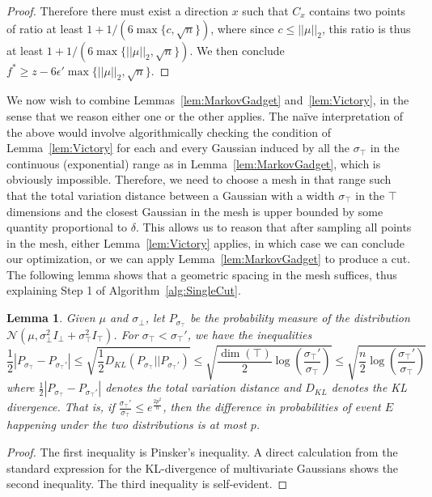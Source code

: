 \documentclass[11pt,letter]{article}
\newcommand{\Normal}{\mathcal{N}}
\newcommand{\perr}{\delta}
\newcounter{nTheorems}
\numberwithin{nTheorems}{section}
\newtheorem{lemma}[nTheorems]{Lemma}
\begin{document}
\begin{proof}
  Therefore there must exist a direction $x$ such that $C_x$ contains two points of ratio at least $1+1/(6\max\{c,\sqrt{n}\})$, where since $c\leq ||\mu||_2$, this ratio is thus at least $1+1/(6\max\{||\mu||_2,\sqrt{n}\})$. We then conclude $f^\ast\geq z-6\epsilon'\max\{||\mu||_2,\sqrt{n}\}$.
\end{proof}

We now wish to combine Lemmas~\ref{lem:MarkovGadget} and~\ref{lem:Victory}, in the sense that we reason either one or the other applies.
The na\"{i}ve interpretation of the above would involve algorithmically checking the condition of Lemma~\ref{lem:Victory} for each and every Gaussian induced by all the $\sigma_\top$ in the continuous (exponential) range as in Lemma~\ref{lem:MarkovGadget}, which is obviously impossible.
Therefore, we need to choose a mesh in that range such that the total variation distance between a Gaussian with a width $\sigma_\top$ in the $\top$ dimensions and the closest Gaussian in the mesh is upper bounded by some quantity proportional to $\perr$.
This allows us to reason that after sampling all points in the mesh, either Lemma~\ref{lem:Victory} applies, in which case we can conclude our optimization, or we can apply Lemma~\ref{lem:MarkovGadget} to produce a cut.
The following lemma shows that a geometric spacing in the mesh suffices, thus explaining Step 1 of Algorithm~\ref{alg:SingleCut}.

\begin{lemma}
\label{lem:Pinsker}
Given $\mu$ and $\sigma_\bot$, let $P_{\sigma_\top}$ be the probability measure of the distribution $\Normal(\mu, \sigma_\bot^2 I_\bot + \sigma_\top^2 I_\top)$.
For $\sigma_\top < \sigma_\top'$, we have the inequalities
$$ \frac{1}{2}|P_{\sigma_\top} - P_{\sigma_\top'}| \le \sqrt{\frac{1}{2}D_{KL}(P_{\sigma_\top} || P_{\sigma_\top'})} \le \sqrt{\frac{\dim(\top)}{2}\log\left(\frac{\sigma_\top'}{\sigma_\top}\right)} \le \sqrt{\frac{n}{2}\log\left(\frac{\sigma_\top'}{\sigma_\top}\right)} $$
where $\frac{1}{2}|P_{\sigma_\top} - P_{\sigma_\top'}|$ denotes the \emph{total variation distance} and $D_{KL}$ denotes the \emph{KL divergence}.
That is, if $\frac{\sigma_\top'}{\sigma_\top} \le e^{\frac{2p^2}{n}}$, then the difference in probabilities of event $E$ happening under the two distributions is at most $p$.
\end{lemma}

\begin{proof}
The first inequality is Pinsker's inequality.
A direct calculation from the standard expression for the KL-divergence of multivariate Gaussians shows the second inequality.
The third inequality is self-evident.
\end{proof}
\end{document}
